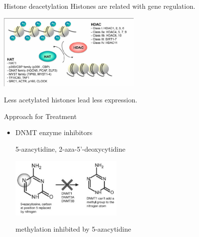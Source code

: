 \documentclass{beamer}
\begin{document}
    \begin{frame}{Histone deacetylation}
        Histones are related with gene regulation.
        \begin{center}
            \includegraphics[height=10em]{hdac}
        \end{center}
        Less acetylated histones lead less expression.
    \end{frame}

    \begin{frame}{Approach for Treatment}
        \begin{itemize}
            \item DNMT enzyme inhibitors
            
                  {\small 5-azacytidine, 2-aza-5’-deoxycytidine}
                  
                  \vspace{2em}
                  \begin{center}
                    \includegraphics[height=8em]{5azcy-inh}
                    
                    {\footnotesize methylation inhibited by 5-azacytidine}
                  \end{center}
        \end{itemize}

    \end{frame}
\end{document}
